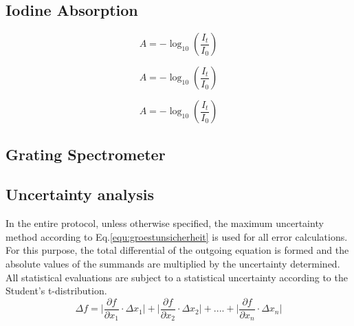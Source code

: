 \subsection{Iodine Absorption}
    
\begin{equation}
    \label{eq:fundamentals:absorbance}
    A = -\log_{10}\left(\frac{I_t}{I_0}\right)
\end{equation}

\begin{equation}
    \label{eq:fundamentals:absorptivity}
    A = -\log_{10}\left(\frac{I_t}{I_0}\right)
\end{equation}

\begin{equation}
    \label{eq:fundamentals:beer}
    A = -\log_{10}\left(\frac{I_t}{I_0}\right)
\end{equation}

\subsection{Grating Spectrometer}





\subsection{Uncertainty analysis}
\label{sec:unsichi}

In the entire protocol, unless otherwise specified, the maximum uncertainty method according to Eq.\ref{equ:groestunsicherheit} \cite{MMETH} is used for all error calculations.
For this purpose, the total differential of the outgoing equation is formed and the absolute values of the summands are multiplied by the uncertainty determined.
All statistical evaluations are subject to a statistical uncertainty according to the Student's t-distribution.
\begin{equation}
    \varDelta f = \biggl| \frac{\partial f}{\partial x_{1}} \cdot \varDelta x_{1} \biggl| + \biggl| \frac{\partial f}{\partial x_{2}} \cdot \varDelta x_{2} \biggl| + .... + \biggl| \frac{\partial f}{\partial x_{n}} \cdot \varDelta x_{n} \biggl|
    \label{equ:groestunsicherheit}
\end{equation}
\newpage